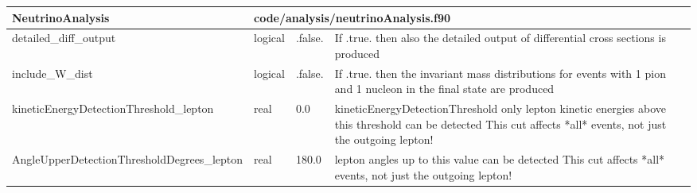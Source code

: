 \documentclass{article}
\begin{document}

\begin{longtable}{llll}
\toprule
\textbf{\large{NeutrinoAnalysis}} & \multicolumn{3}{l}{\footnotesize{code/analysis/neutrinoAnalysis.f90}}\\*
\midrule
\endfirsthead
\midrule
\endhead
detailed\_diff\_output & \begin{minipage}[t]{2cm}logical\end{minipage} & \begin{minipage}[t]{2cm}.false.\end{minipage} & \begin{minipage}[t]{12cm}If .true. then also the detailed output of differential cross sections is produced\end{minipage}\\*
\midrule
include\_W\_dist & \begin{minipage}[t]{2cm}logical\end{minipage} & \begin{minipage}[t]{2cm}.false.\end{minipage} & \begin{minipage}[t]{12cm}If .true. then the invariant mass distributions for events with 1 pion and 1 nucleon in the final state are produced\end{minipage}\\*
\midrule
kineticEnergyDetectionThreshold\_lepton & \begin{minipage}[t]{2cm}real\end{minipage} & \begin{minipage}[t]{2cm}0.0\end{minipage} & \begin{minipage}[t]{12cm}kineticEnergyDetectionThreshold only lepton kinetic energies above this threshold can be detected This cut affects *all* events, not just the outgoing lepton!\end{minipage}\\*
\midrule
AngleUpperDetectionThresholdDegrees\_lepton & \begin{minipage}[t]{2cm}real\end{minipage} & \begin{minipage}[t]{2cm}180.0\end{minipage} & \begin{minipage}[t]{12cm}lepton angles up to this value can be detected This cut affects *all* events, not just the outgoing lepton!\end{minipage}\\*

\end{longtable}
\end{document}
